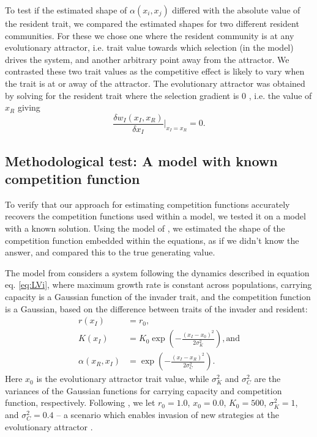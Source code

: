 \documentclass[a4paper,11pt]{article}
\begin{document}
To test if the estimated shape of $\alpha(x_i, x_j)$ differed with the absolute value of the resident trait, we compared the estimated shapes for two different resident communities. For these we chose one where the resident community is at any evolutionary attractor, i.e. trait value towards which selection (in the model) drives the system, and another arbitrary point away from the attractor. We contrasted these two trait values as the competitive effect is likely to vary when the trait is at or away of the attractor. The evolutionary attractor was obtained by solving for the resident trait where the selection gradient is 0 \citep{Geritz-1998}, i.e. the value of $x_R$ giving
\begin{equation} \label{eq:equil}\frac{\delta w_I(x_I, x_R)}{\delta x_I} |_{x_I = x_R} =0.
\end{equation}

\subsection{Methodological test: A model with known competition function}

To verify that our approach for estimating competition functions accurately recovers the competition functions used within a model, we tested it on a model with a known solution. Using the model of \citet{Dieckmann-1999}, we estimated the shape of the competition function embedded within the equations, as if we didn't know the answer, and compared this to the true generating value.

The model from \citet{Dieckmann-1999} considers a system following the dynamics described in equation eq. \ref{eq:LVi}, where maximum growth rate is constant across populations, carrying capacity is a Gaussian function of the invader trait, and the competition function is a Gaussian, based on the difference between traits of the invader and resident:
\begin{subequations}
\begin{align}
\label{eq:DD}
r(x_I) &= r_0, \\
K(x_I) &= K_0 \exp\left(-\frac{\left(x_I-x_0\right)^2}{2\sigma^2_K}\right), \textrm{and}\\
\alpha(x_R, x_I) &= \exp\left(-\frac{\left(x_I-x_R\right)^2}{2\sigma^2_C}\right).
\end{align}
\end{subequations}
Here $x_0$ is the evolutionary attractor trait value, while $\sigma^2_K$ and $\sigma^2_C$ are the variances of the Gaussian functions for carrying capacity and competition function, respectively. Following \citet{Dieckmann-1999}, we let $r_0=1.0$, $x_0=0.0$, $K_0=500$, $\sigma^2_K=1$, and $\sigma^2_C=0.4$ -- a scenario which enables invasion of new strategies at the evolutionary attractor \citep{Dieckmann-1999}.
\end{document}
